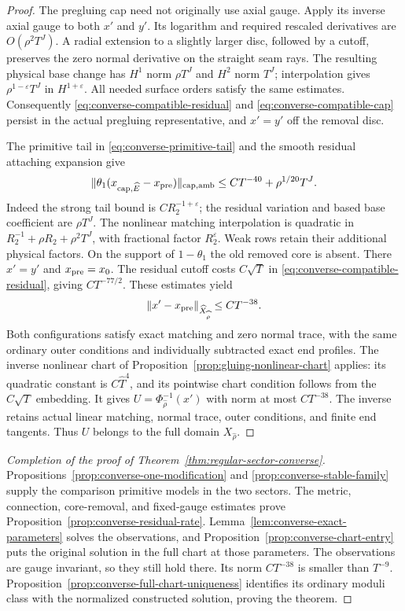 \documentclass[11pt]{amsart}
\theoremstyle{definition}
\theoremstyle{remark}
\theoremstyle{plain}
\begin{document}
\begin{proof}
The pregluing cap need not originally use axial gauge.
Apply its inverse axial gauge to both $x'$ and $y'$.
Its logarithm and required rescaled derivatives are
$O(\rho^2T^J)$. A radial extension to a slightly larger
disc, followed by a cutoff, preserves the zero normal
derivative on the straight seam rays. The resulting
physical base change has $H^1$ norm $\rho T^J$
and $H^2$ norm $T^J$; interpolation gives
$\rho^{1-\varepsilon}T^J$ in $H^{1+\varepsilon}$.
All needed surface orders satisfy the same estimates.
Consequently \eqref{eq:converse-compatible-residual} and
\eqref{eq:converse-compatible-cap} persist in the actual
pregluing representative, and $x'=y'$ off the removal disc.

The primitive tail in \eqref{eq:converse-primitive-tail}
and the smooth residual attaching expansion give
\[
 \|\theta_1(x_{\mathrm{cap},\widehat E}-x_{\rm pre})\|
                 _{\mathrm{cap,amb}}
                     \leq CT^{-40}+\rho^{1/20}T^J .
\]
Indeed the strong tail bound is $CR_2^{-1+\varepsilon}$;
the residual variation and based base coefficient are
$\rho T^J$. The nonlinear matching interpolation is
quadratic in $R_2^{-1}+\rho R_2+\rho^2T^J$,
with fractional factor $R_2^\varepsilon$.
Weak rows retain their additional physical factors.
On the support of $1-\theta_1$ the old removed core
is absent. There $x'=y'$ and $x_{\rm pre}=x_0$.
The residual cutoff costs $C\sqrt T$ in
\eqref{eq:converse-compatible-residual}, giving
$CT^{-77/2}$. These estimates yield
\[
                  \|x'-x_{\rm pre}\|_{\widehat X_{\widehat\rho}}
                                      \leq CT^{-38}.
\]
Both configurations satisfy exact matching and zero normal
trace, with the same ordinary outer conditions and individually
subtracted exact end profiles. The inverse nonlinear chart of
Proposition~\ref{prop:gluing-nonlinear-chart} applies:
its quadratic constant is $C\widehat T^4$, and its pointwise
chart condition follows from the $C\sqrt T$ embedding.
It gives $U=\Phi_{\widehat\rho}^{-1}(x')$ with norm
at most $CT^{-38}$. The inverse retains actual linear
matching, normal trace, outer conditions, and finite end
tangents. Thus $U$ belongs to the full domain $X_{\widehat\rho}$.
\end{proof}

\begin{proof}[Completion of the proof of Theorem~\ref{thm:regular-sector-converse}]
Propositions~\ref{prop:converse-one-modification} and
\ref{prop:converse-stable-family} supply the comparison primitive
models in the two sectors. The metric, connection, core-removal,
and fixed-gauge estimates prove
Proposition~\ref{prop:converse-residual-rate}.
Lemma~\ref{lem:converse-exact-parameters} solves the observations,
and Proposition~\ref{prop:converse-chart-entry} puts the
original solution in the full chart at those parameters.
The observations are gauge invariant, so they still hold
there. Its norm $CT^{-38}$ is smaller than $T^{-9}$.
Proposition~\ref{prop:converse-full-chart-uniqueness} identifies
its ordinary moduli class with the normalized constructed
solution, proving the theorem.
\end{proof}
\end{document}
